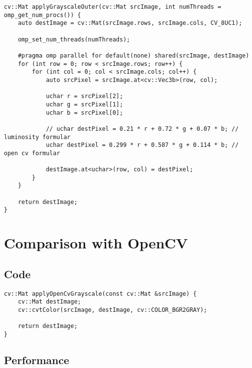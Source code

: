     

    \begin{listing}[H]
        \begin{verbatim}
cv::Mat applyGrayscaleOuter(cv::Mat srcImage, int numThreads = omp_get_num_procs()) {
    auto destImage = cv::Mat(srcImage.rows, srcImage.cols, CV_8UC1);

    omp_set_num_threads(numThreads);

    #pragma omp parallel for default(none) shared(srcImage, destImage)
    for (int row = 0; row < srcImage.rows; row++) {
        for (int col = 0; col < srcImage.cols; col++) {
            auto srcPixel = srcImage.at<cv::Vec3b>(row, col);

            uchar r = srcPixel[2];
            uchar g = srcPixel[1];
            uchar b = srcPixel[0];

            // uchar destPixel = 0.21 * r + 0.72 * g + 0.07 * b; // luminosity formular
            uchar destPixel = 0.299 * r + 0.587 * g + 0.114 * b; // open cv formular

            destImage.at<uchar>(row, col) = destPixel;
        }
    }

    return destImage;
}
        \end{verbatim}
        \label{listing:grayscale}
    \end{listing}


\section{Comparison with OpenCV}

\subsection{Code}

\begin{listing}[H]
    \begin{verbatim}
cv::Mat applyOpenCvGrayscale(const cv::Mat &srcImage) {
    cv::Mat destImage;
    cv::cvtColor(srcImage, destImage, cv::COLOR_BGR2GRAY);

    return destImage;
}
    \end{verbatim}
    \label{listing:grayscale_opencv}
\end{listing}

\subsection{Performance}

